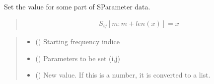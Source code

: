 \documentclass[letterpaper,10pt,english]{sphinxmanual}
\begin{document}
\begin{fulllineitems}
\begin{fulllineitems}
\begin{quote}
\begin{description}
\end{description}\end{quote}

\end{fulllineitems}


\begin{fulllineitems}
\label{\detokenize{touchstone:touchstone.spfile.setdata_format}}
\pysigstartsignatures
{}
\pysigstopsignatures
\end{fulllineitems}


\begin{fulllineitems}
\label{\detokenize{touchstone:touchstone.spfile.setdatapoint}}
\pysigstartsignatures
{}
\pysigstopsignatures
\sphinxAtStartPar
Set the value for some part of S\sphinxhyphen{}Parameter data.
\begin{quote}
\begin{equation*}
\begin{split}S_{i j}[m:m+len(x)]=x\end{split}
\end{equation*}\end{quote}
\begin{quote}\begin{description}
\begin{itemize}
\item {}
\sphinxAtStartPar
{} () \textendash{} Starting frequency indice

\item {}
\sphinxAtStartPar
{} () \textendash{} Parameters to be set (i,j)

\item {}
\sphinxAtStartPar
{} () \textendash{} New value. If this is a number, it is converted to a list.


\end{itemize}
\end{description}
\end{quote}
\end{fulllineitems}
\end{fulllineitems}
\end{document}
